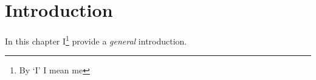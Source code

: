 \chapter{Introduction}
\label{chapter:intro}

In this chapter I\footnote{By `I' I mean me} provide a \emph{general} introduction.